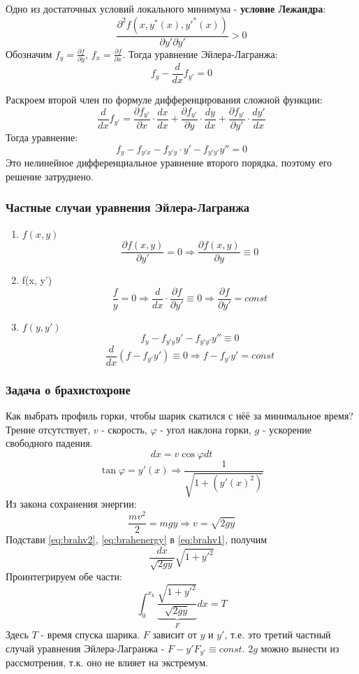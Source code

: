 \documentclass[a4paper, 14pt]{extarticle}
\numberwithin{equation}{section}
\begin{document}
    Одно из достаточных условий локального минимума - \textbf{условие Лежандра}:
    \[ \frac{\partial^2 f(x, y^*(x), y'^*(x))}{\partial y' \partial y'} > 0  \]
    Обозначим $f_y= \frac{\partial f}{\partial y}$, $f_x = \frac{\partial f }{\partial x} $. Тогда уравнение Эйлера-Лагранжа:
    \[ f_y - \frac{d}{dx} f_{y'} = 0 \]

    Раскроем второй член по формуле дифференцирования сложной функции:
    \[ \frac{d}{dx} f_{y'} = \frac{\partial f_{y'}}{\partial x} \cdot \frac{dx}{dx} + \frac{\partial f_{y'}}{\partial y} \cdot \frac{dy}{dx} + \frac{\partial f_{y'}}{\partial y'} \cdot \frac{dy'}{dx} \]
    Тогда уравнение:
    \[ f_y - f_{y'x} - f_{y'y} \cdot y' - f_{y'y'}y'' = 0 \]
    Это нелинейное дифференциальное уравнение второго порядка, поэтому его решение затруднено.
    \subsubsection{Частные случаи уравнения Эйлера-Лагранжа}
    \begin{enumerate}
        \item $f(x,y)$
            \[ \frac{\partial f(x,y)}{ \partial y' } = 0 \Rightarrow \frac{ \partial f(x,y) }{ \partial y} \equiv 0  \]
        \item f(x, y')
        \[ \frac{f}{y} = 0 \Rightarrow \frac{d}{dx} \cdot \frac{ \partial f}{ \partial y' } \equiv 0 \Rightarrow \frac{ \partial f }{ \partial y' } = const \]
        \item $f(y, y')$
        \[ f_y - f_{y'y}y' - f_{y'y'}y'' \equiv 0 \]
        \[ \frac{d}{dx} (f - f_{y'}y') \equiv 0 \Rightarrow f - f_{y'}y' = const \]
    \end{enumerate}
    
    \subsubsection{Задача о брахистохроне}
    Как выбрать профиль горки, чтобы шарик скатился с нёё за минимальное время? Трение отсутствует,  $v$ - скорость, $\varphi$ - угол наклона горки, $g$ - ускорение свободного падения.
    \begin{equation}
        \label{eq:brahv1}
        dx = v \cos \varphi dt 
    \end{equation}
    \begin{equation}
        \label{eq:brahv2}
        \tan \varphi = y'(x) \Rightarrow \frac{1}{\sqrt{1 + (y'(x)^2)}}  
    \end{equation}
    Из закона сохранения энергии:
    \begin{equation}
        \label{eq:brahenergy}
        \frac{mv^2}{2} = mgy \Rightarrow v = \sqrt{2gy} 
    \end{equation}
    Подстави \ref{eq:brahv2}, \ref{eq:brahenergy} в \ref{eq:brahv1}, получим
    \[ \frac{dx}{\sqrt{2gy}} \sqrt{1+y'^2} \]
    Проинтегрируем обе части:
    \[ \int_0^{x_k} \underbrace{ \frac{\sqrt{1+y'^2}}{\sqrt{2gy}}}_F dx = T \]
    Здесь $T$ - время спуска шарика. $F$ зависит от $y$ и $y'$, т.е. это третий частный случай уравнения Эйлера-Лагранжа - $F-y'F_{y'} \equiv const$. $2g$ можно вынести из рассмотрения, т.к. оно не влияет на экстремум.
\end{document}
